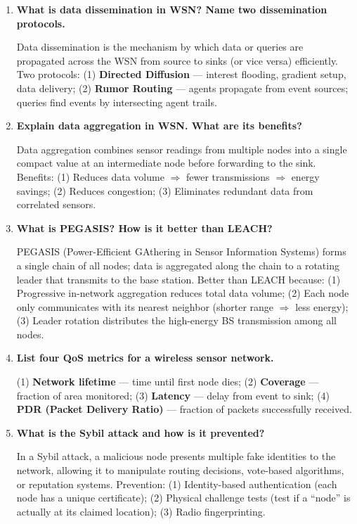 \documentclass[12pt,a4paper]{article}
\newcommand{\Q}[1]{\textbf{#1}\par\noindent\ignorespaces}
\begin{document}
\begin{tcolorbox}[exambox, title={\textbf{Frequently Asked / Viva Questions}}]
\begin{enumerate}[topsep=0pt, label=\textbf{Q\arabic*.}, itemsep=5pt]
  \item \Q{What is data dissemination in WSN? Name two dissemination protocols.}
  Data dissemination is the mechanism by which data or queries are propagated across the WSN from source to sinks (or vice versa) efficiently. Two protocols: (1) \textbf{Directed Diffusion} --- interest flooding, gradient setup, data delivery; (2) \textbf{Rumor Routing} --- agents propagate from event sources; queries find events by intersecting agent trails.

  \item \Q{Explain data aggregation in WSN. What are its benefits?}
  Data aggregation combines sensor readings from multiple nodes into a single compact value at an intermediate node before forwarding to the sink. Benefits: (1) Reduces data volume $\Rightarrow$ fewer transmissions $\Rightarrow$ energy savings; (2) Reduces congestion; (3) Eliminates redundant data from correlated sensors.

  \item \Q{What is PEGASIS? How is it better than LEACH?}
  PEGASIS (Power-Efficient GAthering in Sensor Information Systems) forms a single chain of all nodes; data is aggregated along the chain to a rotating leader that transmits to the base station. Better than LEACH because: (1) Progressive in-network aggregation reduces total data volume; (2) Each node only communicates with its nearest neighbor (shorter range $\Rightarrow$ less energy); (3) Leader rotation distributes the high-energy BS transmission among all nodes.

  \item \Q{List four QoS metrics for a wireless sensor network.}
  (1) \textbf{Network lifetime} --- time until first node dies; (2) \textbf{Coverage} --- fraction of area monitored; (3) \textbf{Latency} --- delay from event to sink; (4) \textbf{PDR (Packet Delivery Ratio)} --- fraction of packets successfully received.

  \item \Q{What is the Sybil attack and how is it prevented?}
  In a Sybil attack, a malicious node presents multiple fake identities to the network, allowing it to manipulate routing decisions, vote-based algorithms, or reputation systems. Prevention: (1) Identity-based authentication (each node has a unique certificate); (2) Physical challenge tests (test if a ``node'' is actually at its claimed location); (3) Radio fingerprinting.


\end{enumerate}
\end{tcolorbox}
\end{document}
